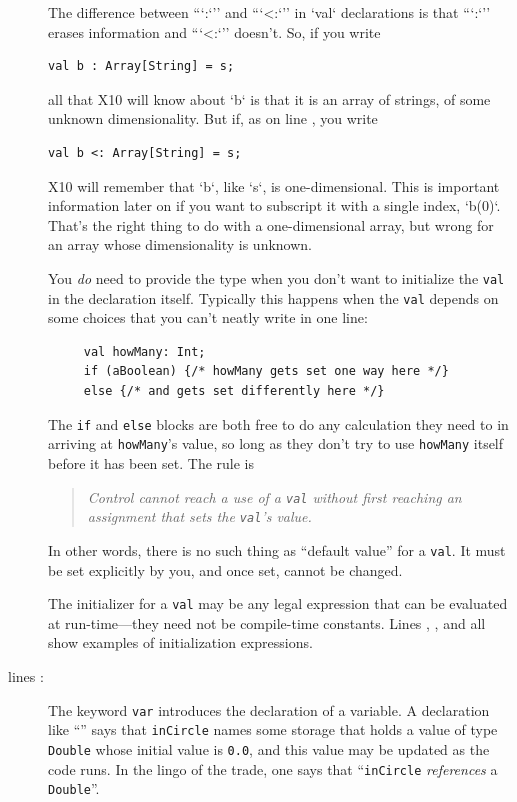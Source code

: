 \begin{description}
\begin{nonquote}
The difference between ``\xcd`:`'' and ``\xcd`<:`'' in \xcd`val` declarations
is that  ``\xcd`:`'' erases information and ``\xcd`<:`'' doesn't.  
So, if you write 
\begin{verbatim}
val b : Array[String] = s;
\end{verbatim}
\noindent
all that X10 will know about \xcd`b` is that it is an array of strings, of
some unknown dimensionality.  But if, as on line , you
write 
\begin{verbatim}
val b <: Array[String] = s;
\end{verbatim}
\noindent
X10 will remember that \xcd`b`, like \xcd`s`, is one-dimensional. This is
important information later on if you want to subscript it with a single
index, \xcd`b(0)`.  That's the right thing to do with a one-dimensional array,
but wrong for an array whose dimensionality is unknown.


You {\em do} need to provide the type when you don't want to initialize
the {\tt val} in the declaration itself.  Typically this happens when the {\tt val}
depends on some choices that you can't neatly write in one line:
\begin{verbatim}
     val howMany: Int;
     if (aBoolean) {/* howMany gets set one way here */}
     else {/* and gets set differently here */}    
\end{verbatim}
The {\tt if} and {\tt else} blocks are both free to do any calculation they
need to in arriving at {\tt howMany}'s value, so long as they don't try to
use {\tt howMany} itself before it has been set.  
The rule is
\begin{quote}
{\em Control cannot reach a use of a {\tt val} without first
reaching an assignment that sets the {\tt val}'s value.}
\end{quote}
In other words, there is no such thing as ``default value'' for a {\tt val}.
It must be set explicitly by you, and once set, cannot be changed.
\end{nonquote}

The initializer for a {\tt val} may be any legal \Xten{} expression that can be
evaluated at run-time---they need not be compile-time constants.  Lines  ,
 , and   all show examples of initialization expressions.

\item[lines  \xlref{mpi1-incircle}{6}:]  
The keyword {\tt var} introduces the declaration of a variable.
A declaration like ``''  says that
{\tt inCircle} names some storage that holds a value of type {\tt Double}
whose initial value is {\tt 0.0}, and this value
may be updated as the code runs.  In the lingo of the trade, one
says that ``{\tt inCircle} {\em references} a {\tt Double}''.  


\end{description}
